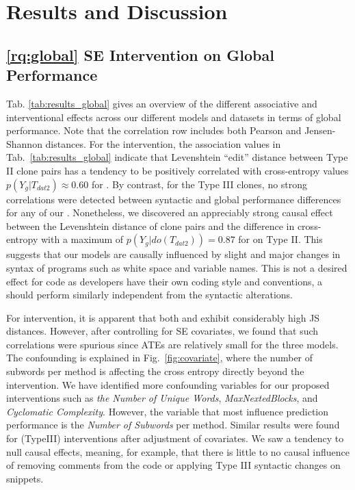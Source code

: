 \section{Results and Discussion}
\label{sec:results}

\subsection{\ref{rq:global} SE Intervention on Global Performance}



Tab. \ref{tab:results_global} gives an overview of the different associative and interventional effects across our different models and datasets in terms of global performance. Note that the correlation row includes both Pearson and Jensen-Shannon distances. For the \datainterII intervention, the association values in Tab.~\ref{tab:results_global} indicate that Levenshtein ``edit'' distance between Type II clone pairs has a tendency to be positively correlated with cross-entropy values $p(Y_g|T_{dat2})\approx0.60$ for \gru. By contrast, for the Type III clones, no strong correlations were detected between syntactic and global performance differences for any of our \nlms. Nonetheless, we discovered an appreciably strong causal effect between the Levenshtein distance of clone pairs and the difference in cross-entropy with a maximum of $p(Y_g|do(T_{dat2}))=0.87$ for \gru on Type II. This suggests that our models are causally influenced by slight and major changes in syntax of programs such as white space and variable names. This is not a desired effect for code \nlms as developers have their own coding style and conventions, a \nlm should perform similarly independent from the syntactic alterations. 

For \datainterI intervention, it is apparent that both \rnn and \tf exhibit considerably high JS distances. However, after controlling for SE covariates, we found that such correlations were spurious since ATEs are relatively small for the three models. The confounding is explained in Fig.~\ref{fig:covariate}, where the number of subwords per method is affecting the cross entropy directly beyond the \datainterI intervention. We have identified more confounding variables for our proposed interventions such as \textit{the Number of Unique Words}, \textit{MaxNextedBlocks}, and \textit{Cyclomatic Complexity}. However, the variable that most influence prediction performance is the \textit{Number of Subwords} per method. Similar results were found for \datainterIII (TypeIII) interventions after adjustment of covariates. We saw a tendency to null causal effects, meaning, for example, that there is little to no causal influence of removing comments from the code or applying Type III syntactic changes on snippets.

